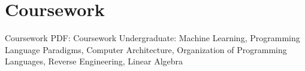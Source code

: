 \section{Coursework}
{Coursework}
{PDF: Coursework}
\BulletItem
Undergraduate: 
Machine Learning, Programming Language Paradigms, Computer Architecture, Organization of Programming Languages, Reverse Engineering, Linear Algebra 